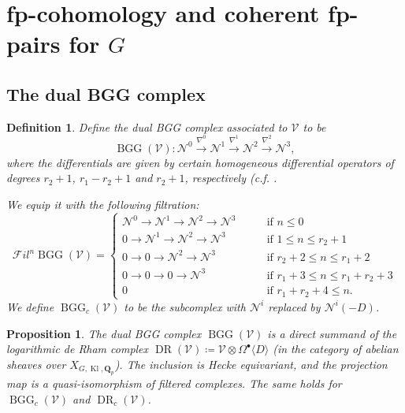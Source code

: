 \documentclass[cjm]{ipart}
\theoremstyle{plain}
\newtheorem{proposition}[theorem]{Proposition}
\newtheorem{definition}[theorem]{Definition}
\theoremstyle{remark}
\DeclareMathOperator{\BGG}{BGG}
\DeclareMathOperator{\DR}{DR}
\DeclareMathOperator{\Kl}{Kl}
\newcommand{\QQ}{\mathbf{Q}}
\newcommand{\Qp}{\QQ_p}
\newcommand{\cN}{\mathcal{N}}
\newcommand{\cV}{\mathcal{V}}
\newcommand{\sFil}{{\mathscr Fil}}
\numberwithin{equation}{subsection}
\renewcommand{\le}{\leqslant}
\renewcommand{\leq}{\leqslant}
\begin{document}



\section{fp-cohomology and coherent fp-pairs for \texorpdfstring{$G$}{G}}\label{sec:fpcohomandfppairs}



 \subsection{The dual BGG complex}\label{ss:dualBGG}

  \begin{definition}\label{def:BGG}
   Define the \emph{dual BGG complex associated to $\cV$} to be
   \[
   \BGG(\cV): \cN^0\xrightarrow{\nabla^0} \cN^1 
    \xrightarrow{\nabla^1} \cN^2 \xrightarrow{\nabla^2} \cN^3,
   \]
   where the differentials are given by certain homogeneous differential operators of degrees $r_2+1$, $r_1-r_2+1$ and $r_2+1$, respectively (c.f. \cite[\S 7]{tilouine12}.

   We equip it with the following filtration:
   \[
   \sFil^n\BGG(\cV)=\begin{cases}
   \cN^0 \to \cN^1 \to \cN^2 \to \cN^3 \qquad &\text{if $n\leq 0$}\\
   0     \to \cN^1 \to \cN^2 \to \cN^3 & \text{if $1 \le n\leq r_2+1$}\\
   0     \to     0 \to \cN^2 \to \cN^3 & \text{if $r_2+2 \le n \leq r_1+2$}\\
   0     \to     0 \to     0 \to \cN^3 & \text{if $r_1+3 \le n\leq r_1+r_2+3$}\\
   0 & \text{if $r_1 + r_2 + 4 \le n$}.
   \end{cases}
   \]
   We define $\BGG_c(\cV)$ to be the subcomplex with $\cN^i$ replaced by $\cN^i(-D)$.
  \end{definition}

  \begin{proposition}\label{prop:dRdirectsummand}
   The dual BGG complex $\BGG(\cV)$ is a direct summand of the logarithmic de Rham complex $\DR(\cV) \coloneqq \cV\otimes \Omega^\bullet\langle D \rangle$ (in the category of abelian sheaves over $X_{G,\Kl, \Qp}$). The inclusion is Hecke equivariant,  and the projection map is a quasi-isomorphism of filtered complexes. The same holds for $\BGG_c(\cV)$ and $\DR_c(\cV)$.
  \end{proposition}
\end{document}
